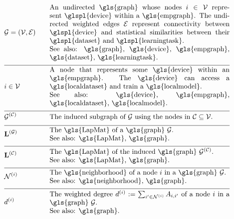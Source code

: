 \begin{align}
 	&\graph = \pair{\nodes}{\edges} & \quad & \parbox{.75\textwidth}{An undirected \gls{graph} whose nodes $\nodeidx \in \nodes$ represent 
		\glspl{device} within a \gls{empgraph}. The undirected weighted edges $\edges$ represent connectivity between 
		\glspl{device} and statistical similarities between their \glspl{dataset} and \glspl{learningtask}.
		\\ See also: \gls{graph}, \gls{device}, \gls{empgraph}, \gls{dataset}, \gls{learningtask}. }\nonumber \\[2mm] \hline \nonumber\\[-5mm]
	&\nodeidx \in \nodes& \quad & \parbox{.75\textwidth}{A node that represents some 
		\gls{device} within an \gls{empgraph}. The \gls{device} can access a \gls{localdataset} and train a \gls{localmodel}.
		\\ See also: \gls{device}, \gls{empgraph}, \gls{localdataset}, \gls{localmodel}. }\nonumber \\[2mm] \hline \nonumber\\[-5mm]
	&\indsubgraph{\graph}{\cluster}& \quad & \parbox{.75\textwidth}{The induced subgraph of $\graph$ using the nodes in $\cluster \subseteq \nodes$. } \nonumber \\[2mm] \hline \nonumber\\[-5mm]
	&\LapMat{\graph}   & \quad & \parbox{.75\textwidth}{The \gls{LapMat} of a \gls{graph} $\graph$.
		\\ See also: \gls{LapMat}, \gls{graph}. }\nonumber \\[2mm] \hline \nonumber\\[-5mm]
	&\LapMat{\cluster}   & \quad & \parbox{.75\textwidth}{The \gls{LapMat} of the induced \gls{graph} $\indsubgraph{\graph}{\cluster}$.
		\\ See also: \gls{LapMat}, \gls{graph}. } \nonumber \\[2mm] \hline \nonumber\\[-5mm]
	 &		\neighbourhood{\nodeidx}  & \quad & \parbox{.75\textwidth}{The \gls{neighborhood} of a node $\nodeidx$ in a \gls{graph} $\graph$.
	 	\\ See also: \gls{neighborhood}, \gls{graph}. }   \nonumber \\[2mm] \hline \nonumber\\[-5mm]
	&\nodedegree{\nodeidx} & \quad & \parbox{.75\textwidth}{The weighted degree $\nodedegree{\nodeidx}\defeq \sum_{\nodeidx' \in \neighbourhood{\nodeidx}} \edgeweight_{\nodeidx,\nodeidx'}$ 
		of a node $\nodeidx$ in a \gls{graph} $\graph$.
		\\ See also: \gls{graph}. }  \nonumber 
\end{align} 


